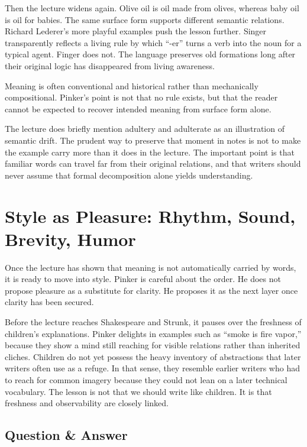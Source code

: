 Then the lecture widens again. Olive oil is oil made from olives, whereas baby oil is oil for babies. The same surface form supports different semantic relations. Richard Lederer's more playful examples push the lesson further. Singer transparently reflects a living rule by which ``-er'' turns a verb into the noun for a typical agent. Finger does not. The language preserves old formations long after their original logic has disappeared from living awareness.

\begin{remark}
Meaning is often conventional and historical rather than mechanically compositional. Pinker's point is not that no rule exists, but that the reader cannot be expected to recover intended meaning from surface form alone.
\end{remark}

The lecture does briefly mention adultery and adulterate as an illustration of semantic drift. The prudent way to preserve that moment in notes is not to make the example carry more than it does in the lecture. The important point is that familiar words can travel far from their original relations, and that writers should never assume that formal decomposition alone yields understanding.

\section{Style as Pleasure: Rhythm, Sound, Brevity, Humor}

Once the lecture has shown that meaning is not automatically carried by words, it is ready to move into style. Pinker is careful about the order. He does not propose pleasure as a substitute for clarity. He proposes it as the next layer once clarity has been secured.

Before the lecture reaches Shakespeare and Strunk, it pauses over the freshness of children's explanations. Pinker delights in examples such as ``smoke is fire vapor,'' because they show a mind still reaching for visible relations rather than inherited cliches. Children do not yet possess the heavy inventory of abstractions that later writers often use as a refuge. In that sense, they resemble earlier writers who had to reach for common imagery because they could not lean on a later technical vocabulary. The lesson is not that we should write like children. It is that freshness and observability are closely linked.

\subsection{Question \& Answer}

